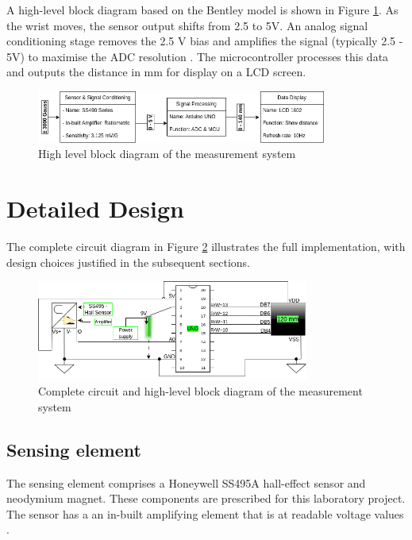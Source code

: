 \documentclass[a4paper,12pt]{article}
\begin{document}
A high-level block diagram based on the Bentley model is shown in Figure \ref{fig:bentley}. As the wrist moves, the sensor output shifts from 2.5 to 5V. An analog signal conditioning stage removes the 2.5 V bias and amplifies the signal (typically 2.5 - 5V) to maximise the ADC resolution . The microcontroller processes this data and outputs the distance in mm for display on a LCD screen.

\begin{figure}[!ht]
    \centering
    \includegraphics[width=0.85\textwidth]{LabBentley.png}
    \caption{High level block diagram of the measurement system}
    \label{fig:bentley}
\end{figure}


%
\section{Detailed Design}
 The complete circuit diagram in Figure \ref{fig:cct_system} illustrates the full implementation, with design choices justified in the subsequent sections. 
\begin{figure}[!ht]
    \centering
    \includegraphics[width=0.8\textwidth]{LabCctDiagBlock.png}
    \caption{Complete circuit and high-level block diagram of the measurement system}
    \label{fig:cct_system}
\end{figure}


\subsection{Sensing element}
The sensing element comprises a Honeywell SS495A hall-effect sensor \cite{ti_datasheet} and neodymium magnet. These components are prescribed for this laboratory project. The sensor has a an in-built amplifying element that is at readable voltage values \cite{ti_datasheet}.
\end{document}
